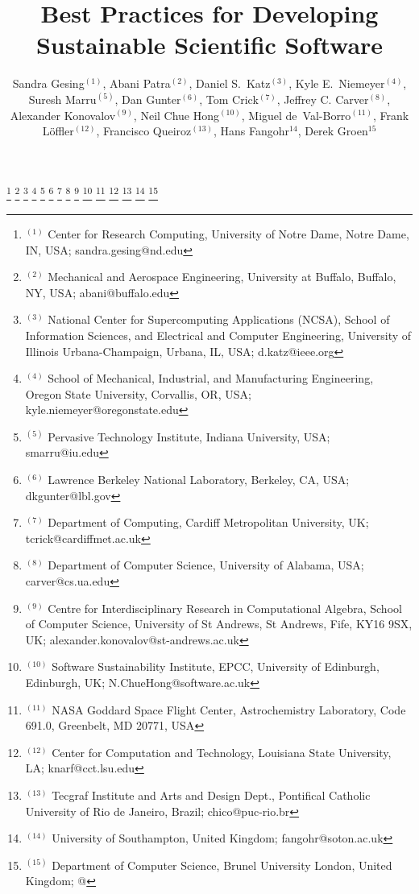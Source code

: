 \documentclass[11pt, oneside]{amsart}
\begin{document}
\title[]{Best Practices for Developing Sustainable Scientific Software}

\author{Sandra Gesing$^{(1)}$,
Abani Patra$^{(2)}$,
Daniel S.\ Katz$^{(3)}$,
Kyle E.\ Niemeyer$^{(4)}$,
Suresh Marru$^{(5)}$,
Dan Gunter$^{(6)}$,
Tom Crick$^{(7)}$,
Jeffrey C. Carver$^{(8)}$,
Alexander Konovalov$^{(9)}$,
Neil Chue Hong$^{(10)}$,
Miguel de~Val-Borro$^{(11)}$,
Frank Löffler$^{(12)}$,
Francisco Queiroz$^{(13)}$,
Hans Fangohr$^{14}$,
Derek Groen$^{15}$
}

%
\thanks{{}$^{(1)}$ Center for Research Computing, University of Notre Dame, Notre Dame, IN, USA; sandra.gesing@nd.edu}
%
\thanks{{}$^{(2)}$ Mechanical and Aerospace Engineering, University at Buffalo, Buffalo, NY, USA; abani@buffalo.edu}
%
\thanks{{}$^{(3)}$ National Center for Supercomputing Applications (NCSA), School of Information Sciences, and Electrical and Computer Engineering, University of Illinois Urbana-Champaign, Urbana, IL, USA; d.katz@ieee.org}
%
\thanks{{}$^{(4)}$ School of Mechanical, Industrial, and Manufacturing Engineering, Oregon State University, Corvallis, OR, USA; kyle.niemeyer@oregonstate.edu}
%
\thanks{{}$^{(5)}$ Pervasive Technology Institute, Indiana University, USA; smarru@iu.edu}
%
\thanks{{}$^{(6)}$ Lawrence Berkeley National Laboratory, Berkeley, CA, USA; dkgunter@lbl.gov}
%
\thanks{{}$^{(7)}$ Department of Computing, Cardiff Metropolitan University, UK; tcrick@cardiffmet.ac.uk}
%
\thanks{{}$^{(8)}$ Department of Computer Science, University of Alabama, USA; carver@cs.ua.edu}
%
\thanks{{}$^{(9)}$  Centre for Interdisciplinary Research in Computational Algebra, School of Computer Science,
University of St Andrews, St Andrews, Fife, KY16 9SX, UK; alexander.konovalov@st-andrews.ac.uk}
%
\thanks{{}$^{(10)}$  Software Sustainability Institute, EPCC, University of Edinburgh, Edinburgh, UK; N.ChueHong@software.ac.uk}
% 
\thanks{{}$^{(11)}$ NASA Goddard Space Flight Center, Astrochemistry Laboratory, Code 691.0,
Greenbelt, MD 20771, USA}
%
\thanks{{}$^{(12)}$ Center for Computation and Technology, Louisiana State University, LA; knarf@cct.lsu.edu}
%
\thanks{{}$^{(13)}$ Tecgraf Institute and Arts and Design Dept., Pontifical Catholic University of Rio de Janeiro, Brazil; chico@puc-rio.br}
%
\thanks{{}$^{(14)}$ University of Southampton, United Kingdom; fangohr@soton.ac.uk}
%
\thanks{{}$^{(15)}$ Department of Computer Science, Brunel University London, United Kingdom; @}

\begin{abstract}


\end{abstract}
\end{document}
